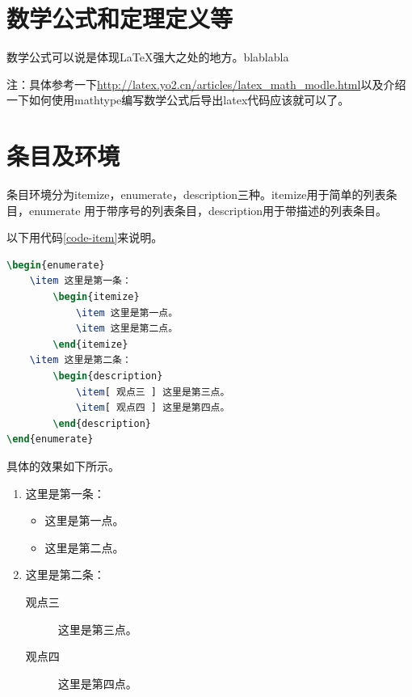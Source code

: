 \section{数学公式和定理定义等}
数学公式可以说是体现\LaTeX{}强大之处的地方。blablabla

注：具体参考一下\url{http://latex.yo2.cn/articles/latex_math_modle.html}以及介绍一下如何使用mathtype编写数学公式后导出latex代码应该就可以了。

\section{条目及环境}
条目环境分为itemize，enumerate，description三种。itemize用于简单的列表条目，enumerate
用于带序号的列表条目，description用于带描述的列表条目。

以下用代码\ref{code-item}来说明。
\begin{lstlisting}[label={code-item},caption={条目环境},language={LaTeX}]
\begin{enumerate}
    \item 这里是第一条：
        \begin{itemize}
            \item 这里是第一点。
            \item 这里是第二点。    
        \end{itemize}
    \item 这里是第二条：
        \begin{description}
            \item[ 观点三 ] 这里是第三点。
            \item[ 观点四 ] 这里是第四点。
        \end{description}
\end{enumerate}
\end{lstlisting}

具体的效果如下所示。
\begin{enumerate}
    \item 这里是第一条：
        \begin{itemize}
            \item 这里是第一点。
            \item 这里是第二点。
        \end{itemize}
    \item 这里是第二条：
        \begin{description}
            \item[观点三] 这里是第三点。
            \item[观点四] 这里是第四点。
        \end{description}
\end{enumerate}

